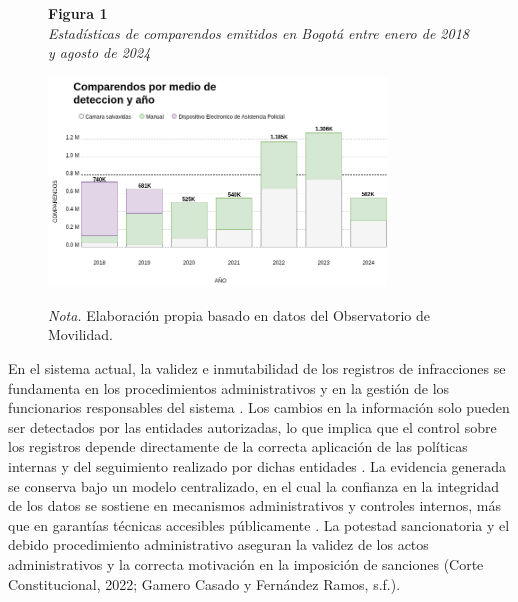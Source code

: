 \begin{figure}[htbp]
    \begin{flushleft}
        \textbf{Figura 1}\\[2em]
        \textit{Estadísticas de comparendos emitidos en Bogotá entre enero de 2018 y agosto de 2024}
    \end{flushleft}
    \vspace{1em}
    \centering
    \includegraphics[width=0.8\textwidth]{Images/numComparendos.png}
    \vspace{2em}
    \begin{flushleft}
        \textit{Nota.} Elaboración propia basado en datos del Observatorio de Movilidad.
    \end{flushleft}
    \label{fig:estadisticas_comparendos}
\end{figure}

En el sistema actual, la validez e inmutabilidad de los registros de infracciones se fundamenta en los procedimientos administrativos y en la gestión de los funcionarios responsables del sistema \parencite{C112_2018}. Los cambios en la información solo pueden ser detectados por las entidades autorizadas, lo que implica que el control sobre los registros depende directamente de la correcta aplicación de las políticas internas y del seguimiento realizado por dichas entidades \parencite{Sentencia123_2019}. La evidencia generada se conserva bajo un modelo centralizado, en el cual la confianza en la integridad de los datos se sostiene en mecanismos administrativos y controles internos, más que en garantías técnicas accesibles públicamente \parencite{DAFP_Lineamientos_2021}. La potestad sancionatoria y el debido procedimiento administrativo aseguran la validez de los actos administrativos y la correcta motivación en la imposición de sanciones (Corte Constitucional, 2022; Gamero Casado y Fernández Ramos, s.f.).

